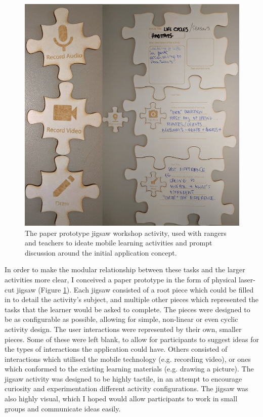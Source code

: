 \begin{figure}
  \centering
  \includegraphics[width=0.75\columnwidth]{images/chapter04/rangerJigsaw.png}
  \caption[The jigsaw prototyping activity]{The paper prototype jigsaw workshop activity, used with rangers and teachers to ideate mobile learning activities and prompt discussion around the initial application concept.}
  \label{fig:rangerJigsaw}
\end{figure}

In order to make the modular relationship between these tasks and the larger activities more clear, I conceived a paper prototype in the form of physical laser-cut jigsaw (Figure \ref{fig:rangerJigsaw}). Each jigsaw consisted of a root piece which could be filled in to detail the activity’s subject, and multiple other pieces which represented the tasks that the learner would be asked to complete. The pieces were designed to be as configurable as possible, allowing for simple, non-linear or even cyclic activity design. The user interactions were represented by their own, smaller pieces. Some of these were left blank, to allow for participants to suggest ideas for the types of interactions the application could have. Others consisted of interactions which utilised the mobile technology (e.g. recording video), or ones which conformed to the existing learning materials (e.g. drawing a picture). The jigsaw activity was designed to be highly tactile, in an attempt to encourage curiosity and experimentation different activity configurations. The jigsaw was also highly visual, which I hoped would allow participants to work in small groups and communicate ideas easily.

